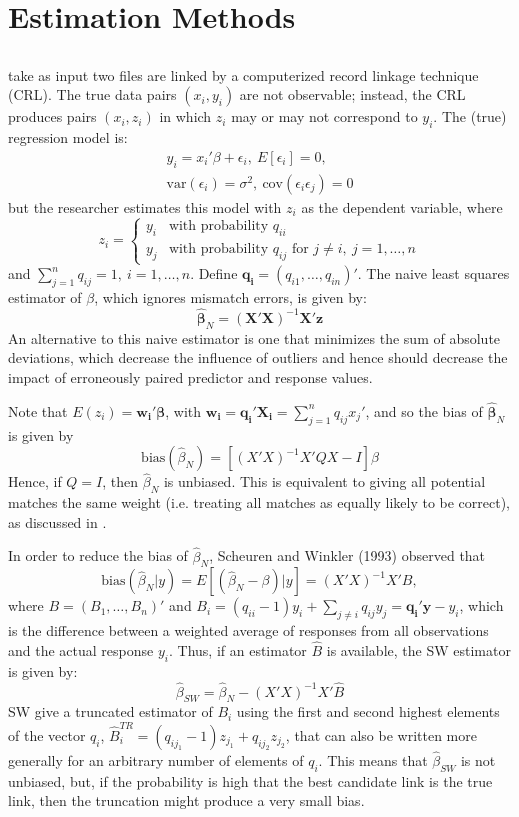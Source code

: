 \documentclass[12pt]{article}
\begin{document}
\section{Estimation Methods}

\subsection{\cite{lahiri05}}
\cite{lahiri05} take as input two files are linked by a computerized record linkage technique (CRL).  The true data pairs $(x_i, y_i)$ are not observable; instead, the CRL produces pairs $(x_i, z_i)$ in which $z_i$ may or may not correspond to $y_i$.  The (true) regression model is:
\begin{gather*}y_i = x_i'\beta + \epsilon_i,\ E[\epsilon_i] = 0,\\ \text{var}(\epsilon_i) = \sigma^2,\ \text{cov}(\epsilon_i \epsilon_j) = 0 \end{gather*}
but the researcher estimates this model with $z_i$ as the dependent variable, where $$z_i = \begin{cases} y_i & \text{with probability $q_{ii}$} \\ y_j & \text{with probability $q_{ij}$ for $j\neq i,\ j = 1,\dots,n $} \end{cases}$$ 
and $\sum_{j=1}^n q_{ij} = 1, \ i=1,\dots, n$.  Define $\mathbf{q_i} = (q_{i1}, \dots, q_{in})'$.  The naive least squares estimator of $\beta$, which ignores mismatch errors, is given by:
$$\hat{\mathbf{\beta}}_N = (\mathbf{X'X})^{-1} \mathbf{X'z} $$ 
An alternative to this naive estimator is one that minimizes the sum of absolute deviations, which decrease the influence of outliers and hence should decrease the impact of erroneously paired predictor and response values.  

Note that $E(z_i) = \mathbf{w_i'\beta}$, with $\mathbf{w_i = q_i'X_i} = \sum_{j=1}^n q_{ij} x_j' $, and so the bias of $\hat{\mathbf{\beta}}_N $ is given by
$$\text{bias}(\hat{\beta}_N) = [(X'X)^{-1} X'QX - I] \beta $$ 
Hence, if $Q = I$, then $\hat{\beta}_N$ is unbiased.  This is equivalent to giving all potential matches the same weight (i.e. treating all matches as equally likely to be correct), as discussed in \cite{ahl2019}.  

In order to reduce the bias of $\hat{\beta}_N$, Scheuren and Winkler (1993) %
observed that 
$$\text{bias} (\hat{\beta}_N | y) = E[(\hat{\beta}_N - \beta) | y ] = (X'X)^{-1} X'B,$$ 
where $B = (B_1, \dots, B_n)'$ and $B_i = (q_{ii}-1)y_i + \sum_{j\neq i } q_{ij} y_j = \mathbf{q_i'y} - y_i$, which is the difference between a weighted average of responses from all observations and the actual response $y_i$.  Thus, if an estimator $\hat{B}$ is available, the SW estimator is given by:
$$ \hat{\beta}_{SW} = \hat{\beta}_N - (X'X)^{-1} X' \hat{B}$$ 
SW give a truncated estimator of $B_i$ using the first and second highest elements of the vector $q_i$, $\hat{B}_i^{TR} = (q_{ij_1} - 1) z_{j_1} + q_{ij_2} z_{j_2}$, that can also be written more generally for an arbitrary number of elements of $q_i$.  This means that $\hat{\beta}_{SW}$ is not unbiased, but, if the probability is high that the best candidate link is the true link, then the truncation might produce a very small bias. 
\end{document}
